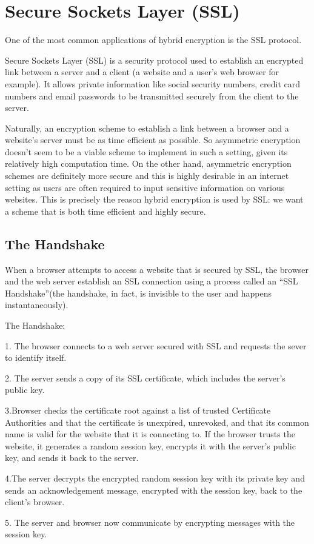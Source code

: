 \section{Secure Sockets Layer (SSL)}

One of the most common applications of hybrid encryption is the SSL protocol.

Secure Sockets Layer (SSL) is a security protocol used to establish an encrypted link between a server and a client (a website and a user's web browser for example). It allows private information like social security numbers, credit card numbers and email passwords to be transmitted securely from the client to the server.

Naturally, an encryption scheme to establish a link between a browser and a website's server must be as time efficient as possible. So asymmetric encryption doesn't seem to be a viable scheme to implement in such a setting, given its relatively high computation time. On the other hand, asymmetric encryption schemes are definitely more secure and this is highly desirable in an internet setting as users are often required to input sensitive information on various websites. This is precisely the reason hybrid encryption is used by SSL: we want a scheme that is both time efficient and highly secure.

\subsection{The Handshake}


\cite{digicert}When a browser attempts to access a website that is secured by SSL, the browser and the web server establish an SSL connection using a process called an “SSL Handshake”(the handshake, in fact, is invisible to the user and happens instantaneously).

The Handshake:

1. The browser connects to a web server secured with SSL and requests the sever to identify itself.

2. The server sends a copy of its SSL certificate, which includes the server's public key.

3.Browser checks the certificate root against a list of trusted Certificate Authorities and that the certificate is unexpired, unrevoked, and that its common name is valid for the website that it is connecting to. If the browser trusts the website, it generates a random session key, encrypts it with the server's public key, and sends it back to the server.

4.The server decrypts the encrypted random session key with its private key and sends an acknowledgement message, encrypted with the session key, back to the client's browser.

5. The server and browser now communicate by encrypting messages with the session key.



